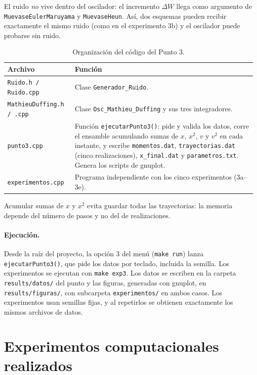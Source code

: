 \documentclass[12pt,a4paper]{article}
\begin{document}
El ruido \emph{no} vive dentro del oscilador: el incremento $\Delta W$ llega como argumento de \texttt{MuevaseEulerMaruyama} y \texttt{MuevaseHeun}. Así, dos esquemas pueden recibir exactamente el mismo ruido (como en el experimento 3b) y el oscilador puede probarse sin ruido.

\begin{table}[H]
\centering
\small
\begin{tabular}{@{}lp{10.5cm}@{}}
\toprule
Archivo & Función\\
\midrule
\texttt{Ruido.h / Ruido.cpp} & Clase \texttt{Generador\_Ruido}.\\
\texttt{MathieuDuffing.h / .cpp} & Clase \texttt{Osc\_Mathieu\_Duffing} y sus tres integradores.\\
\texttt{punto3.cpp} & Función \texttt{ejecutarPunto3()}: pide y valida los datos, corre el ensamble acumulando sumas de $x$, $x^2$, $v$ y $v^2$ en cada instante, y escribe \texttt{momentos.dat}, \texttt{trayectorias.dat} (cinco realizaciones), \texttt{x\_final.dat} y \texttt{parametros.txt}. Genera los scripts de gnuplot.\\
\texttt{experimentos.cpp} & Programa independiente con los cinco experimentos (3a--3e).\\
\bottomrule
\end{tabular}
\caption{Organización del código del Punto 3.}
\end{table}

Acumular sumas de $x$ y $x^2$ evita guardar todas las trayectorias: la memoria depende del número de pasos y no del de realizaciones.

\paragraph{Ejecución.} Desde la raíz del proyecto, la opción 3 del menú (\texttt{make run}) lanza \texttt{ejecutarPunto3()}, que pide los datos por teclado, incluida la semilla. Los experimentos se ejecutan con \texttt{make exp3}. Los datos se escriben en la carpeta \texttt{results/datos/} del punto y las figuras, generadas con gnuplot, en \texttt{results/figuras/}, con subcarpeta \texttt{experimentos/} en ambos casos. Los experimentos usan semillas fijas, y al repetirlos se obtienen exactamente los mismos archivos de datos.

\section{Experimentos computacionales realizados}
\end{document}
